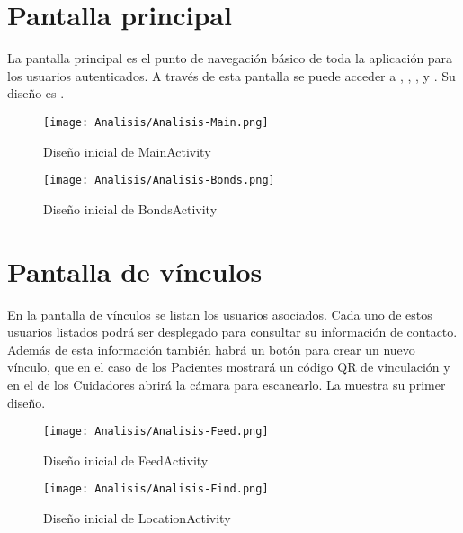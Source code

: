 \section{Pantalla principal}
\label{sec:pantalla_principal}

La pantalla principal es el punto de navegación básico de toda la aplicación para los usuarios autenticados. A través de esta pantalla se puede acceder a , , ,  y . Su diseño es .

\begin{figure}[H]
    \centering
    \begin{minipage}{0.45\textwidth}
        \centering
        \texttt{[image: Analisis/Analisis-Main.png]}
        \caption{Diseño inicial de MainActivity}
        \label{fig:ui:main}
    \end{minipage}\hfill
    \begin{minipage}{0.45\textwidth}
        \centering
        \texttt{[image: Analisis/Analisis-Bonds.png]}
        \caption{Diseño inicial de BondsActivity}
        \label{fig:ui:bonds}
    \end{minipage}
\end{figure}

\section{Pantalla de vínculos}
\label{sec:pantalla_vinculos}

En la pantalla de vínculos se listan los usuarios asociados. Cada uno de estos usuarios listados podrá ser desplegado para consultar su información de contacto. Además de esta información también habrá un botón para crear un nuevo vínculo, que en el caso de los Pacientes mostrará un código QR de vinculación y en el de los Cuidadores abrirá la cámara para escanearlo. La  muestra su primer diseño.

\begin{figure}[H]
    \centering
    \begin{minipage}{0.45\textwidth}
        \centering
        \texttt{[image: Analisis/Analisis-Feed.png]}
        \caption{Diseño inicial de FeedActivity}
        \label{fig:ui:feed}
    \end{minipage}\hfill
    \begin{minipage}{0.45\textwidth}
        \centering
        \texttt{[image: Analisis/Analisis-Find.png]}
        \caption{Diseño inicial de LocationActivity}
        \label{fig:ui:location}
    \end{minipage}
\end{figure}

